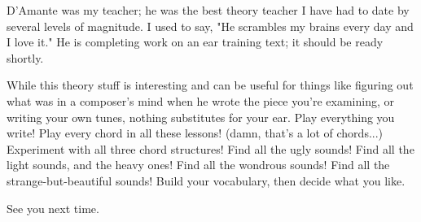 D'Amante was my teacher; he was the best theory teacher I have had to
date by several levels of magnitude. I used to say, "He scrambles my
brains every day and I love it." He is completing work on an ear training
text; it should be ready shortly.

While this theory stuff is interesting and can be useful for things like
figuring out what was in a composer's mind when he wrote the piece you're
examining, or writing your own tunes, nothing substitutes for your ear.
Play everything you write! Play every chord in all these lessons! (damn,
that's a lot of chords...) Experiment with all three chord structures!
Find all the ugly sounds! Find all the light sounds, and the heavy ones!
Find all the wondrous sounds! Find all the strange-but-beautiful sounds!
Build your vocabulary, then decide what you like.

See you next time.


